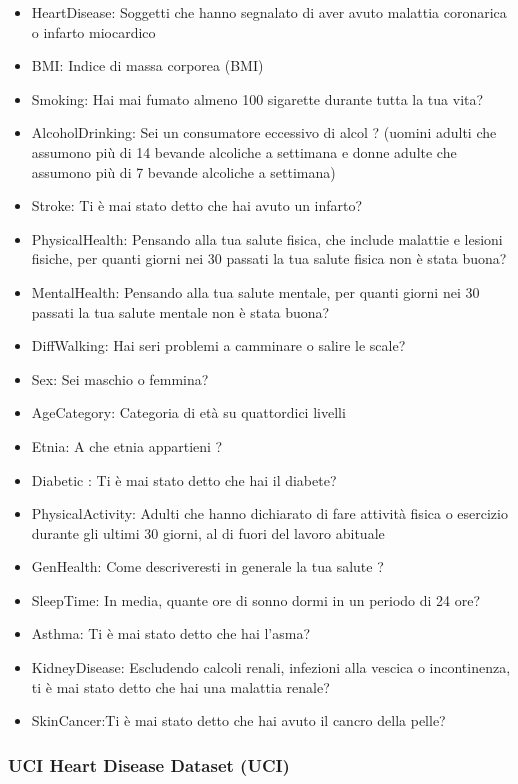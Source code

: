 \begin{flushleft}
\begin{itemize}
\item HeartDisease: Soggetti che hanno segnalato di aver avuto malattia coronarica o infarto miocardico 
\item BMI: Indice di massa corporea (BMI)
\item Smoking: Hai mai fumato almeno 100 sigarette durante tutta la tua vita? 
\item AlcoholDrinking: Sei un consumatore eccessivo di alcol ? (uomini adulti che assumono più di 14 bevande alcoliche a settimana e donne adulte che assumono più di 7 bevande alcoliche a settimana)
\item Stroke: Ti è mai stato detto che hai avuto un infarto?
\item PhysicalHealth: Pensando alla tua salute fisica, che include malattie e lesioni fisiche, per quanti giorni nei 30 passati la tua salute fisica non è stata buona? 
\item MentalHealth: Pensando alla tua salute mentale, per quanti giorni nei 30 passati la tua salute mentale non è stata buona? 
\item DiffWalking: Hai seri problemi a camminare o salire le scale?
\item Sex: Sei maschio o femmina?
\item AgeCategory: Categoria di età su quattordici livelli
\item Etnia: A che etnia appartieni ?
\item Diabetic : Ti è mai stato detto che hai il diabete?
\item PhysicalActivity: Adulti che hanno dichiarato di fare attività fisica o esercizio durante gli ultimi 30 giorni, al di fuori del lavoro abituale
\item GenHealth: Come descriveresti in generale la tua salute ?
\item SleepTime: In media, quante ore di sonno dormi in un periodo di 24 ore?
\item Asthma: Ti è mai stato detto che hai l'asma?
\item KidneyDisease: Escludendo calcoli renali, infezioni alla vescica o incontinenza, ti è mai stato detto che hai una malattia renale?
\item SkinCancer:Ti è mai stato detto che hai avuto il cancro della pelle?
\end{itemize}

\subsubsection{UCI Heart Disease Dataset (UCI)}



\end{flushleft}
